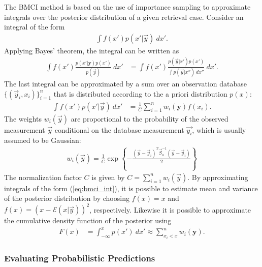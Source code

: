 \documentclass[journal abbreviation, manuscript]{copernicus}
\begin{document}
    The BMCI method is based on the use of importance sampling to approximate
    integrals over the posterior distribution of a given retrieval case. Consider an
    integral of the form
    \begin{align}\label{eq:bmci_int}
     \int f(x') p(x'|\vec{y}) \: dx'.
    \end{align}
    Applying Bayes' theorem, the integral can be written as
    \begin{align}
    \int f(x') \frac{p(x'|\mathbf{y}) p(x')}{p(\vec{y})} \: dx' &=
    \int f(x') \frac{p(\vec{y} | x')p(x')}
                    {\int p(\vec{y} | x'') \: dx''} \: dx'.
    \end{align}
    The last integral can be approximated by a sum over an observation
    database $\{(\vec{y}_i, x_i)\}_{i = 1}^n$ that is distributed according
    to the a priori distribution $p(x)$:
    \begin{align}
    \int f(x') p(x' | \vec{y}) \: dx' & = \frac{1}{C}  \sum_{i = 1}^n w_i(\mathbf{y}) f(x_i)
            .
    \end{align}
    The weights $w_i(\vec{y})$ are proportional to the probability
    of the observed measurement $\vec{y}$ conditional on the database
    measurement $\vec{y_i}$, which is usually assumed to be Gaussian:
    \begin{align}
    w_i(\vec{y}) = \frac{1}{C} \exp \left \{- \frac{(\vec{y} - \vec{y}_i)^T \vec{S}_o^{-1}
                                       (\vec{y} - \vec{y}_i)}{2} \right \}
    \end{align}
    The normalization factor $C$ is given by $C = \sum_{i = 1}^n w_i(\vec{y}).$ By
    approximating integrals of the form (\ref{eq:bmci_int}), it is possible to
    estimate mean and variance of the posterior distribution by choosing $f(x) =
    x$ and $f(x) = (x - \mathcal{E}(x | \vec{y}))^2$, respectively. Likewise it
    is possible to approximate the cumulative density function of the posterior
    using
    \begin{align}
    \label{eq:cdf}
    F(x) &= \int_{-\infty}^x  p(x') \: dx'\approx \sum_{x_i < x}^n w_i(\mathbf{y}).
    \end{align}

\subsubsection{Evaluating Probabilistic Predictions}
\end{document}
